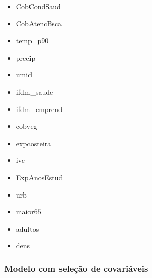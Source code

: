 \documentclass[12pt,a4paper]{article}\usepackage[]{graphicx}\usepackage[]{color}
\begin{document}
\begin{itemize}
  \item CobCondSaud
  \item CobAtencBsca
  \item temp\_p$90$
  \item precip
  \item umid
  \item ifdm\_saude
  \item ifdm\_emprend
  \item cobveg
  \item expcosteira
  \item ivc
  \item ExpAnosEstud
  \item urb
  \item maior$65$
  \item adultos
  \item dens
\end{itemize}

\subsubsection{\textbf{Modelo com seleção de covariáveis}}
\end{document}
